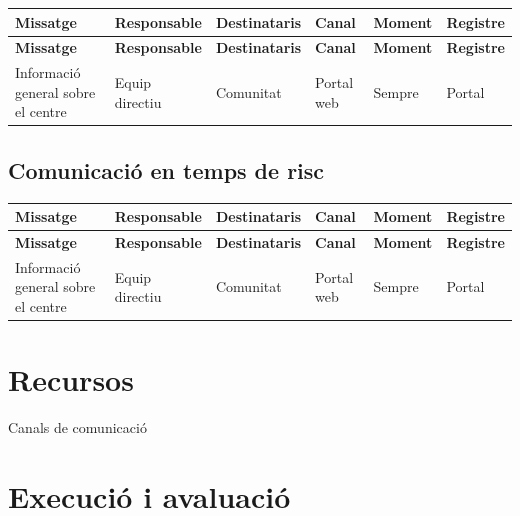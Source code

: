 \documentclass[fontsize=10pt,%
paper=a4,%
DIV=14,%
pagesize=auto,%
parskip=half,
captions=tableheading,%
numbers=noenddot,%
toc=graduated%
]{scrartcl}
\renewcommand{\arraystretch}{1.75}%
\renewcommand{\arraystretch}{1.75}%
\begin{document}
\small{
\setlength{\tabcolsep}{10pt}
\renewcommand{\arraystretch}{1.5}
\begin{longtable}{p{3cm}p{2cm}p{2cm}p{1.5cm}p{2cm}p{1.5cm}}
\hline
\textbf{Missatge}  & \textbf{Responsable} & \textbf{Destinataris} & \textbf{Canal} & \textbf{Moment} & \textbf{Registre}\\
\hline \endfirsthead
\hline
\textbf{Missatge}  & \textbf{Responsable} & \textbf{Destinataris} & \textbf{Canal} & \textbf{Moment} & \textbf{Registre}\\
\hline \endhead
Informació general sobre el centre & Equip directiu & Comunitat & Portal web & Sempre & Portal\\
\end{longtable}
}%

\subsection{Comunicació en temps de risc}

\small{
\setlength{\tabcolsep}{10pt}
\renewcommand{\arraystretch}{1.5}
\begin{longtable}{p{3cm}p{2cm}p{2cm}p{1.5cm}p{2cm}p{1.5cm}}
\hline
\textbf{Missatge}  & \textbf{Responsable} & \textbf{Destinataris} & \textbf{Canal} & \textbf{Moment} & \textbf{Registre}\\
\hline \endfirsthead
\hline
\textbf{Missatge}  & \textbf{Responsable} & \textbf{Destinataris} & \textbf{Canal} & \textbf{Moment} & \textbf{Registre}\\
\hline \endhead
Informació general sobre el centre & Equip directiu & Comunitat & Portal web & Sempre & Portal\\
\end{longtable}
}%

\section{Recursos}\label{sec:recursos}

Canals de comunicació

\section{Execució i avaluació}\label{sec:execiaval}
\end{document}
